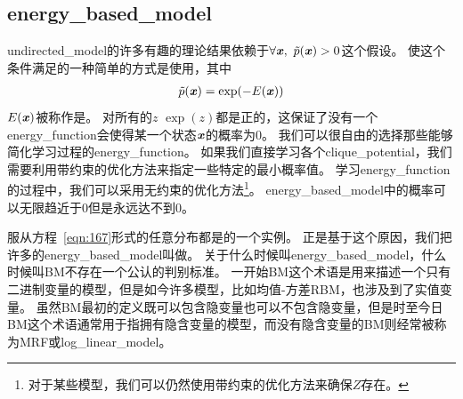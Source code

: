 \subsection{\gls{energy_based_model}}
\label{sec:energy_based_models}


\gls{undirected_model}的许多有趣的理论结果依赖于$\forall \boldsymbol{\mathit{x}},\ \tilde{p}(\boldsymbol{\mathit{x}})>0$这个假设。
使这个条件满足的一种简单的方式是使用，其中
\begin{align}
\label{eqn:167}
\tilde{p}(\boldsymbol{\mathit{x}}) = \exp(-E(\boldsymbol{\mathit{x}}))
\end{align}
$E(\boldsymbol{\mathit{x}})$被称作是。
对所有的$z$ $\exp(z)$都是正的，这保证了没有一个\gls{energy_function}会使得某一个状态$\boldsymbol{\mathit{x}}$的概率为0。
我们可以很自由的选择那些能够简化学习过程的\gls{energy_function}。
如果我们直接学习各个\gls{clique_potential}，我们需要利用带约束的优化方法来指定一些特定的最小概率值。
学习\gls{energy_function}的过程中，我们可以采用无约束的优化方法\footnote{对于某些模型，我们可以仍然使用带约束的优化方法来确保$Z$存在。}。
\gls{energy_based_model}中的概率可以无限趋近于0但是永远达不到0。


服从方程~\eqref{eqn:167}形式的任意分布都是的一个实例。
正是基于这个原因，我们把许多的\gls{energy_based_model}叫做\citep{Fahlman83,Ackley85,Hinton84,Hinton86a}。
关于什么时候叫\gls{energy_based_model}，什么时候叫\gls{BM}不存在一个公认的判别标准。
一开始\gls{BM}这个术语是用来描述一个只有二进制变量的模型，但是如今许多模型，比如均值-方差\gls{RBM}，也涉及到了实值变量。
虽然\gls{BM}最初的定义既可以包含隐变量也可以不包含隐变量，但是时至今日\gls{BM}这个术语通常用于指拥有隐含变量的模型，而没有隐含变量的\gls{BM}则经常被称为\gls{MRF}或\gls{log_linear_model}。



